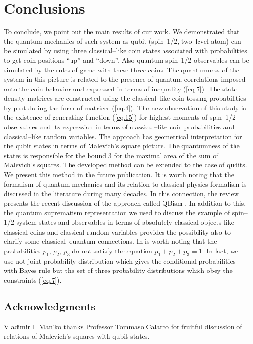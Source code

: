 \documentclass[12pt]{article}
\begin{document}
\section{Conclusions}
To conclude, we point out the main results of our work. We demonstrated that the quantum mechanics of such system as qubit (spin--1/2, two--level atom) can be simulated by using three classical--like coin  states associated with probabilities to get coin positions ``up'' and ``down''. Also quantum spin--1/2 observables can be simulated by the rules of game with these three coins. The quantumness of the system in this picture is related to the presence of quantum correlations imposed onto the coin behavior and expressed in terms of inequality (\ref{eq.7}). The state density matrices are constructed using the classical--like coin tossing probabilities by postulating the form of matrices (\ref{eq.4}). The new observation of this study is the existence of generating function (\ref{eq.15}) for highest moments of spin--1/2 observables and its expression in terms of classical--like coin probabilities and classical--like random variables. The approach has geometrical interpretation for the qubit states in terms of Malevich's square  picture. The quantumness of the states is responsible for the bound 3 for the maximal area of the sum of Malevich's squares. The developed method can be extended to the case of qudits. We present this method in the future publication. It is worth noting that the formalism of quantum mechanics and its relation to classical physics formalism is discussed in the literature during many decades. In this connection,  the review \cite{Mermin} presents the recent discussion of the approach called QBism \cite{Fuchs}. In addition to this, the quantum suprematism representation we used to discuss the example of spin--1/2 system states and observables in terms of absolutely classical objects like classical coins and classical random variables provides the possibility also to clarify some classical--quantum connections. In is worth noting that the probabilities $p_1,\,p_2,\,p_3$ do not satisfy the equation $p_1+p_2+p_3=1$. In fact, we use not joint probability distribution which gives the conditional probabilities with Bayes rule but the set of three probability distributions which obey the constraints (\ref{eq.7}).

\subsection*{Acknowledgments}
Vladimir I. Man'ko thanks Professor Tommaso Calarco for fruitful discussion of relations of Malevich's squares with qubit states.
\end{document}
